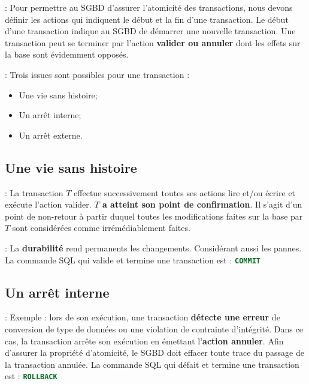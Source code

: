 \documentclass[10pt]{beamer}
\begin{document}
\begin{frame}{\secname : \subsecname}
    Pour permettre au SGBD d'assurer l'atomicité des transactions, nous devons définir les actions qui indiquent le début et la fin d'une transaction.
    Le début d'une transaction indique au SGBD de démarrer une nouvelle transaction.
    Une transaction peut se terminer par l'action \textbf{valider ou annuler} dont les effets sur la base sont évidemment opposés.
\end{frame}

\begin{frame}{\secname : \subsecname}
    Trois issues sont possibles pour une transaction :
    \begin{itemize}
        \item Une vie sans histoire;
        \item Un arrêt interne;
        \item Un arrêt externe.
    \end{itemize}
\end{frame}
\subsection{Une vie sans histoire}
\begin{frame}{\secname : \subsecname}
    La transaction $T$ effectue successivement toutes ses actions lire et/ou écrire et exécute l'action valider.
    \textbf{$T$ a atteint son point de confirmation}.  Il s'agit d'un point de non-retour à partir duquel toutes les modifications faites sur la base par $T$ sont considérées comme irrémédiablement faites.
\end{frame}

\begin{frame}{\secname : \subsecname}
    La \textbf{durabilité} rend permanents les changements. Considérant aussi les pannes.
    La commande SQL qui valide et termine une transaction est : \lstinline[language=sql]!COMMIT!
\end{frame}

\subsection{Un arrêt interne}
\begin{frame}{\secname : \subsecname}
    Exemple : lors de son exécution, une transaction \textbf{détecte une erreur} de conversion de type de données ou une violation de contrainte d'intégrité.
    Dans ce cas, la transaction arrête son exécution en émettant l'\textbf{action annuler}.
    Afin d'assurer la propriété d'atomicité, le SGBD doit effacer toute trace du passage de la transaction annulée.
    La commande SQL qui défait et termine une transaction est : \lstinline[language=sql]!ROLLBACK!
\end{frame}
\end{document}
